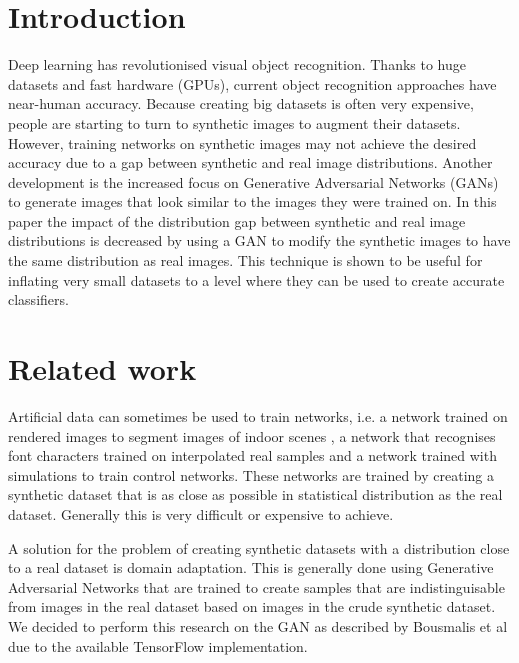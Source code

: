 \documentclass[10pt,twocolumn,letterpaper]{article}
\begin{document}
\section{Introduction}

Deep learning has revolutionised visual object recognition. Thanks to huge datasets and fast hardware (GPUs), current object recognition approaches have near-human accuracy.
Because creating big datasets is often very expensive, people are starting to turn to synthetic images to augment their datasets. However, training networks on synthetic images may not achieve the desired accuracy due to a gap between synthetic and real image distributions. \cite{10.1.1.151.7688}
Another development is the increased focus on Generative Adversarial Networks (GANs) to generate images that look similar to the images they were trained on. \cite{1406.2661}
In this paper the impact of the distribution gap between synthetic and real image distributions is decreased by using a GAN to modify the synthetic images to have the same distribution as real images. This technique is shown to be useful for inflating very small datasets to a level where they can be used to create accurate classifiers.

\section{Related work}
Artificial data can sometimes be used to train networks, i.e. a network trained on rendered images to segment images of indoor scenes \cite{10.1.1.94.777}, a network that recognises font characters trained on interpolated real samples \cite{10.1.1.151.7688} and a network trained with simulations to train control networks. \cite{10.1109/CVPR.2016.442} These networks are trained by creating a synthetic dataset that is as close as possible in statistical distribution as the real dataset. Generally this is very difficult or expensive to achieve.

A solution for the problem of creating synthetic datasets with a distribution close to a real dataset is domain adaptation. This is generally done using Generative Adversarial Networks \cite{1703.05192.pdf, 10.1109/CVPR.2017.18, 10.1007/978-3-319-58347-1} that are trained to create samples that are indistinguisable from images in the real dataset based on images in the crude synthetic dataset. We decided to perform this research on the GAN as described by Bousmalis et al \cite{10.1109/CVPR.2017.18} due to the available TensorFlow \cite{tensorflow} implementation.
\end{document}
